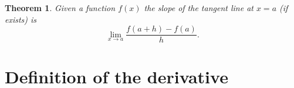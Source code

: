 \documentclass[12pt,a4paper]{book}
\newtheorem{theorem}{Theorem}[section]
\numberwithin{equation}{section}
\begin{document}
\begin{tcolorbox}[width=\textwidth,colback={green!20},title={},colbacktitle=yellow,coltitle=blue]
\begin{theorem}
Given a function $f(x)$ the slope of the tangent line at $x=a$ (if exists) is 
$$\lim_{x\to a} \frac{f(a+h)-f(a)}{h}.$$
\end{theorem}
\end{tcolorbox}

%
%

\section{Definition of the derivative}
\end{document}
